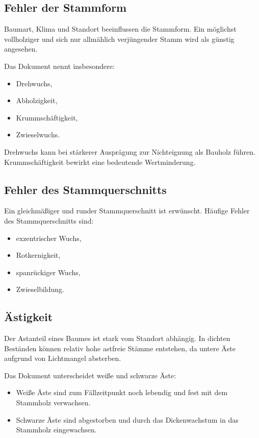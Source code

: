 \documentclass[
  12pt,
  a4paper,
  oneside
]{scrreprt}
\begin{document}
\subsection{Fehler der Stammform}

Baumart, Klima und Standort beeinflussen die Stammform. Ein möglichst
vollholziger und sich nur allmählich verjüngender Stamm wird als
günstig angesehen. 

Das Dokument nennt insbesondere:

\begin{itemize}
  \item Drehwuchs,
  \item Abholzigkeit,
  \item Krummschäftigkeit,
  \item Zwieselwuchs.
\end{itemize}



Drehwuchs kann bei stärkerer Ausprägung zur Nichteignung als Bauholz
führen. Krummschäftigkeit bewirkt eine bedeutende Wertminderung.


\subsection{Fehler des Stammquerschnitts}

Ein gleichmäßiger und runder Stammquerschnitt ist erwünscht. Häufige
Fehler des Stammquerschnitts sind:

\begin{itemize}
  \item exzentrischer Wuchs,
  \item Rotkernigkeit,
  \item spanrückiger Wuchs,
  \item Zwieselbildung.
\end{itemize}



\subsection{Ästigkeit}

Der Astanteil eines Baumes ist stark vom Standort abhängig. In dichten
Beständen können relativ hohe astfreie Stämme entstehen, da untere Äste
aufgrund von Lichtmangel absterben. 

Das Dokument unterscheidet weiße und schwarze Äste:

\begin{itemize}
  \item Weiße Äste sind zum Fällzeitpunkt noch lebendig und fest mit
  dem Stammholz verwachsen.

  \item Schwarze Äste sind abgestorben und durch das Dickenwachstum in
  das Stammholz eingewachsen.
\end{itemize}
\end{document}
